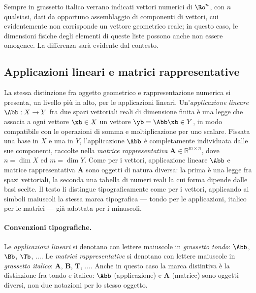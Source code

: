 Sempre in grassetto italico verrano indicati vettori numerici di $\Ro^n$, con $n$ qualsiasi, dati da opportuno 
assemblaggio di componenti di vettori, cui evidentemente non corrisponde un vettore geometrico reale; in questo caso, le dimensioni
fisiche degli elementi di queste liste possono anche non essere omogenee. 
 La differenza sarà 
evidente dal contesto.

\subsection{Applicazioni lineari e matrici rappresentative}
\label{sec:applic_matrici}

La stessa distinzione fra oggetto geometrico e rappresentazione 
numerica si presenta, un livello più in alto, per le applicazioni 
lineari. Un'\textit{applicazione lineare} $\Abb : X \to Y$ fra 
due spazi vettoriali reali di dimensione finita è una legge che 
associa a ogni vettore $\xb \in X$ un vettore $\yb=\Abb\xb \in Y$, in 
modo compatibile con le operazioni di somma e moltiplicazione 
per uno scalare. Fissata una base in $X$ e una in $Y$, 
l'applicazione $\Abb$ è completamente individuata dalle sue 
componenti, raccolte nella \textit{matrice rappresentativa} 
$\bm{A} \in \mathbb{R}^{m \times n}$, dove $n = \dim X$ ed 
$m = \dim Y$. Come per i vettori, applicazione lineare $\Abb$ e 
matrice rappresentativa $\bm{A}$ sono oggetti di natura diversa: 
la prima è una legge fra spazi vettoriali, la seconda una 
tabella di numeri reali la cui forma dipende dalle basi scelte. 
Il testo li distingue tipograficamente come per i vettori, 
applicando ai simboli maiuscoli la stessa marca tipografica 
--- tondo per le applicazioni, italico per le matrici --- già 
adottata per i minuscoli.

\paragraph{Convenzioni tipografiche.}
Le \textit{applicazioni lineari} si denotano con lettere 
maiuscole in \textit{grassetto tondo}: $\Abb$, $\Bb$, 
$\Tb$, $\ldots$. Le \textit{matrici rappresentative} si 
denotano con lettere maiuscole in \textit{grassetto italico}: 
$\bm{A}$, $\bm{B}$, $\bm{T}$, $\ldots$. Anche in questo caso 
la marca distintiva è la distinzione fra tondo e italico: 
$\Abb$ (applicazione) e $\bm{A}$ (matrice) sono oggetti 
diversi, non due notazioni per lo stesso oggetto.

